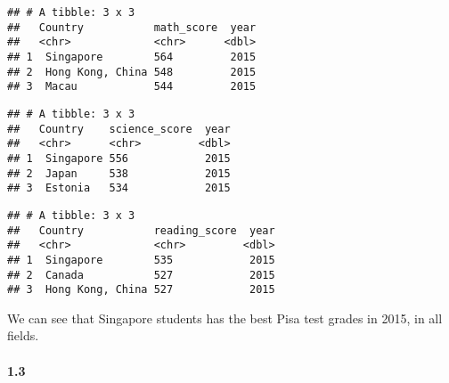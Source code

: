 \documentclass[]{article}
\newenvironment{Shaded}{\begin{snugshade}}{\end{snugshade}}
\newcommand{\KeywordTok}[1]{\textcolor[rgb]{0.13,0.29,0.53}{\textbf{#1}}}
\newcommand{\DataTypeTok}[1]{\textcolor[rgb]{0.13,0.29,0.53}{#1}}
\newcommand{\DecValTok}[1]{\textcolor[rgb]{0.00,0.00,0.81}{#1}}
\newcommand{\StringTok}[1]{\textcolor[rgb]{0.31,0.60,0.02}{#1}}
\newcommand{\OtherTok}[1]{\textcolor[rgb]{0.56,0.35,0.01}{#1}}
\newcommand{\OperatorTok}[1]{\textcolor[rgb]{0.81,0.36,0.00}{\textbf{#1}}}
\newcommand{\NormalTok}[1]{#1}
\let\oldparagraph\paragraph
\renewcommand{\paragraph}[1]{\oldparagraph{#1}\mbox{}}
\begin{document}
\begin{verbatim}
## # A tibble: 3 x 3
##   Country           math_score  year
##   <chr>             <chr>      <dbl>
## 1  Singapore        564         2015
## 2  Hong Kong, China 548         2015
## 3  Macau            544         2015
\end{verbatim}

\begin{Shaded}
\end{Shaded}

\begin{verbatim}
## # A tibble: 3 x 3
##   Country    science_score  year
##   <chr>      <chr>         <dbl>
## 1  Singapore 556            2015
## 2  Japan     538            2015
## 3  Estonia   534            2015
\end{verbatim}

\begin{Shaded}
\end{Shaded}

\begin{verbatim}
## # A tibble: 3 x 3
##   Country           reading_score  year
##   <chr>             <chr>         <dbl>
## 1  Singapore        535            2015
## 2  Canada           527            2015
## 3  Hong Kong, China 527            2015
\end{verbatim}

We can see that Singapore students has the best Pisa test grades in
2015, in all fields.

\paragraph{1.3}\label{section-2}
\end{document}
